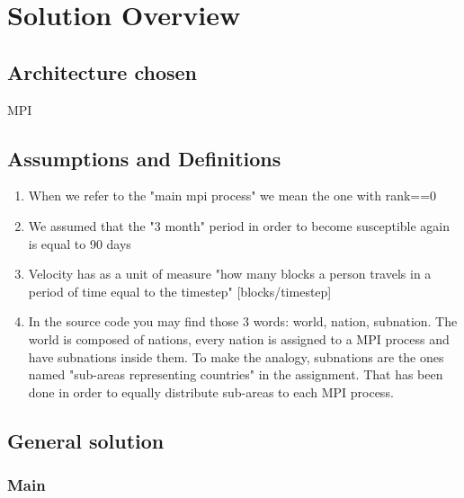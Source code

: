 \documentclass[table, 12pt]{article}
\begin{document}
\section{Solution Overview}
\subsection{Architecture chosen}
MPI



\subsection{Assumptions and Definitions}
\begin{enumerate}
\setlength\itemsep{-0.5em}
	\item When we refer to the "main mpi process" we mean the one with rank==0
    \item We assumed that the "3 month" period in order to become susceptible again is equal to 90 days
    \item Velocity has as a unit of measure "how many blocks a person travels in a period of time equal to the timestep" [blocks/timestep]
    \item In the source code you may find those 3 words: world, nation, subnation. The world is composed of nations, every nation is assigned to a MPI process and have subnations inside them. To make the analogy, subnations are the ones named "sub-areas representing countries" in the assignment. That has been done in order to equally distribute sub-areas to each MPI process.
\end{enumerate}

\subsection{General solution}
\subsubsection{Main}
\end{document}
